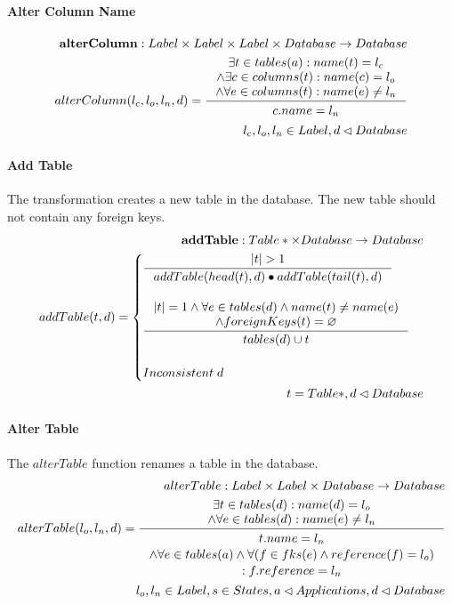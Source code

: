 \documentclass[11pt]{article}
\begin{document}
\paragraph{Alter Column Name}
\begin{align*}
\mathbf{alterColumn} : Label \times Label \times Label \times Database \rightarrow Database \\
	alterColumn(l_c, l_o, l_n, d) =
 \inference{\exists t \in tables(a) : name(t) = l_c \\ \wedge \exists c \in columns(t) : name(c) = l_o \\ \wedge \forall e \in columns(t) : name(e) \neq l_n}{\begin{gathered}
c.name = l_n 
\end{gathered}}
 \\
l_c, l_o, l_n \in Label, d \lhd Database
\end{align*}

\paragraph{Add Table} The transformation creates a new table in the database. The new table should not contain any foreign keys.
\begin{align*}
	\mathbf{addTable} : Table* \times Database \rightarrow Database \\ 
	addTable(t, d) = \begin{cases}
		\inference{|t| > 1}{addTable(head(t),d) \bullet addTable(tail(t), d)}
\\ \\	
		\inference{|t| = 1 \wedge \forall e \in tables(d) \wedge name(t) \neq name(e) \\ \wedge foreignKeys(t) = \varnothing }{tables(d) \cup t}
\\ \\
		Inconsistent \;d 
	 \end{cases}\\ 
	t = Table*, d \lhd Database
\end{align*}

\paragraph{Alter Table} The $alterTable$ function renames a table in  the database.
\begin{align*}
alterTable:  Label \times Label \times Database \rightarrow Database \\
alterTable(l_o, l_n, d) = \inference{\exists t \in tables(d) : name(d) = l_o \\ \wedge \forall e \in tables(d) : name(e) \neq l_n}{\begin{gathered}
t.name = l_n \\ \wedge \forall e \in tables(a) \wedge \forall (f \in fks(e) \wedge reference(f) = l_o ) \\ : f.reference = l_n 
\end{gathered}}\\
l_o, l_n \in Label, s \in States, a \lhd Applications, d \lhd Database
\end{align*}
\end{document}
